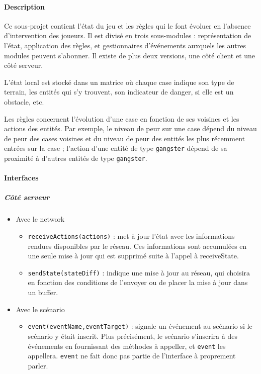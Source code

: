 \documentclass[a4paper,10pt]{article}
\begin{document}
\paragraph{Description} Ce sous-projet contient l'état du jeu et les règles qui le font évoluer en l'absence d'intervention des joueurs. Il est divisé en trois sous-modules : représentation de l'état, application des règles, et gestionnaires d'événements auxquels les autres modules peuvent s'abonner. Il existe de plus deux versions, une côté client et une côté serveur.

L'état local est stocké dans un matrice où chaque case indique son type de terrain, les entités qui s'y trouvent, son indicateur de danger, si elle est un obstacle, etc.

Les règles concernent l'évolution d'une case en fonction de ses voisines et les actions des entités. Par exemple, le niveau de peur sur une case dépend du niveau de peur des cases voisines et du niveau de peur des entités les plus récemment entrées sur la case ; l'action d'une entité de type \verb!gangster! dépend de sa proximité à d'autres entités de type \verb!gangster!.

\paragraph{Interfaces}

\subparagraph{Côté serveur}

\begin{itemize}

\item Avec le network

  \begin{itemize}
  \item \verb!receiveActions(actions)! : met à jour l'état avec les informations rendues disponibles par le réseau. Ces informations sont accumulées en une seule mise à jour qui est supprimé suite à l'appel à receiveState. 

  \item \verb!sendState(stateDiff)! : indique une mise à jour au réseau, qui choisira en fonction des conditions de l'envoyer ou de placer la mise à jour dans un buffer.
  \end{itemize}

\item Avec le scénario

  \begin{itemize}
  \item \verb!event(eventName,eventTarget)! : signale un événement au scénario si le scénario y était inscrit. Plus précisément, le scénario s'inscrira à des événements en fournissant des méthodes à appeller, et \verb!event! les appellera. \verb!event! ne fait donc pas partie de l'interface à proprement parler.
  \end{itemize}
\end{itemize}
\end{document}
